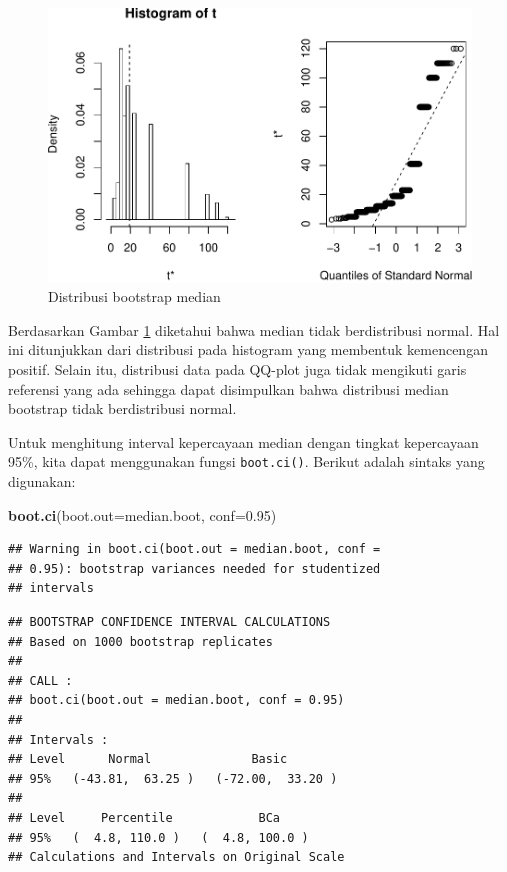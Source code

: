 \documentclass[]{book}
\newenvironment{Shaded}{\begin{snugshade}}{\end{snugshade}}
\newcommand{\KeywordTok}[1]{\textcolor[rgb]{0.13,0.29,0.53}{\textbf{#1}}}
\newcommand{\DataTypeTok}[1]{\textcolor[rgb]{0.13,0.29,0.53}{#1}}
\newcommand{\FloatTok}[1]{\textcolor[rgb]{0.00,0.00,0.81}{#1}}
\newcommand{\NormalTok}[1]{#1}
\begin{document}
\begin{figure}

{\centering \includegraphics[width=0.65\linewidth]{EnvStat_files/figure-latex/boot1-1} 

}

\caption{Distribusi bootstrap median}\label{fig:boot1}
\end{figure}

Berdasarkan Gambar \ref{fig:boot1} diketahui bahwa median tidak
berdistribusi normal. Hal ini ditunjukkan dari distribusi pada histogram
yang membentuk kemencengan positif. Selain itu, distribusi data pada
QQ-plot juga tidak mengikuti garis referensi yang ada sehingga dapat
disimpulkan bahwa distribusi median bootstrap tidak berdistribusi
normal.

Untuk menghitung interval kepercayaan median dengan tingkat kepercayaan
95\%, kita dapat menggunakan fungsi \texttt{boot.ci()}. Berikut adalah
sintaks yang digunakan:

\begin{Shaded}
\begin{Highlighting}[]
\KeywordTok{boot.ci}\NormalTok{(}\DataTypeTok{boot.out=}\NormalTok{median.boot, }\DataTypeTok{conf=}\FloatTok{0.95}\NormalTok{)}
\end{Highlighting}
\end{Shaded}

\begin{verbatim}
## Warning in boot.ci(boot.out = median.boot, conf =
## 0.95): bootstrap variances needed for studentized
## intervals
\end{verbatim}

\begin{verbatim}
## BOOTSTRAP CONFIDENCE INTERVAL CALCULATIONS
## Based on 1000 bootstrap replicates
## 
## CALL : 
## boot.ci(boot.out = median.boot, conf = 0.95)
## 
## Intervals : 
## Level      Normal              Basic         
## 95%   (-43.81,  63.25 )   (-72.00,  33.20 )  
## 
## Level     Percentile            BCa          
## 95%   (  4.8, 110.0 )   (  4.8, 100.0 )  
## Calculations and Intervals on Original Scale
\end{verbatim}
\end{document}
